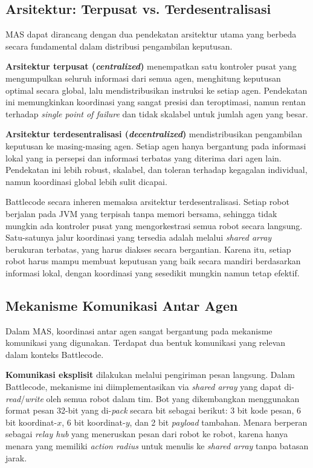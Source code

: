 \subsection{Arsitektur: Terpusat vs. Terdesentralisasi}

MAS dapat dirancang dengan dua pendekatan arsitektur utama yang berbeda secara fundamental dalam distribusi pengambilan keputusan.

\textbf{Arsitektur terpusat (\textit{centralized})} menempatkan satu kontroler pusat yang mengumpulkan seluruh informasi dari semua agen, menghitung keputusan optimal secara global, lalu mendistribusikan instruksi ke setiap agen. Pendekatan ini memungkinkan koordinasi yang sangat presisi dan teroptimasi, namun rentan terhadap \textit{single point of failure} dan tidak skalabel untuk jumlah agen yang besar.

\textbf{Arsitektur terdesentralisasi (\textit{decentralized})} mendistribusikan pengambilan keputusan ke masing-masing agen. Setiap agen hanya bergantung pada informasi lokal yang ia persepsi dan informasi terbatas yang diterima dari agen lain. Pendekatan ini lebih robust, skalabel, dan toleran terhadap kegagalan individual, namun koordinasi global lebih sulit dicapai.

Battlecode secara inheren memaksa arsitektur terdesentralisasi. Setiap robot berjalan pada JVM yang terpisah tanpa memori bersama, sehingga tidak mungkin ada kontroler pusat yang mengorkestrasi semua robot secara langsung. Satu-satunya jalur koordinasi yang tersedia adalah melalui \textit{shared array} berukuran terbatas, yang harus diakses secara bergantian. Karena itu, setiap robot harus mampu membuat keputusan yang baik secara mandiri berdasarkan informasi lokal, dengan koordinasi yang sesedikit mungkin namun tetap efektif.

\subsection{Mekanisme Komunikasi Antar Agen}

Dalam MAS, koordinasi antar agen sangat bergantung pada mekanisme komunikasi yang digunakan. Terdapat dua bentuk komunikasi yang relevan dalam konteks Battlecode.

\textbf{Komunikasi eksplisit} dilakukan melalui pengiriman pesan langsung. Dalam Battlecode, mekanisme ini diimplementasikan via \textit{shared array} yang dapat di-\textit{read}/\textit{write} oleh semua robot dalam tim. Bot yang dikembangkan menggunakan format pesan 32-bit yang di-\textit{pack} secara bit sebagai berikut: 3 bit kode pesan, 6 bit koordinat-$x$, 6 bit koordinat-$y$, dan 2 bit \textit{payload} tambahan. Menara berperan sebagai \textit{relay hub} yang meneruskan pesan dari robot ke robot, karena hanya menara yang memiliki \textit{action radius} untuk menulis ke \textit{shared array} tanpa batasan jarak.


